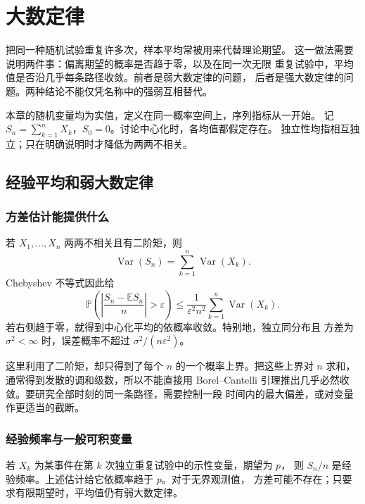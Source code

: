 \chapter{大数定律}
\label{chap:laws-of-large-numbers}

把同一种随机试验重复许多次，样本平均常被用来代替理论期望。
这一做法需要说明两件事：偏离期望的概率是否趋于零，以及在同一次无限
重复试验中，平均值是否沿几乎每条路径收敛。前者是弱大数定律的问题，
后者是强大数定律的问题。两种结论不能仅凭名称中的强弱互相替代。

本章的随机变量均为实值，定义在同一概率空间上，序列指标从一开始。
记 $S_n=\sum_{k=1}^nX_k$，$S_0=0$。讨论中心化时，各均值都假定存在。
独立性均指相互独立；只在明确说明时才降低为两两不相关。

\section{经验平均和弱大数定律}
\label{sec:weak-law-empirical-average}

\subsection{方差估计能提供什么}

若 $X_1,\ldots,X_n$ 两两不相关且有二阶矩，则
\[
 \operatorname{Var}(S_n)=\sum_{k=1}^n\operatorname{Var}(X_k).
\]
Chebyshev 不等式因此给
\begin{equation}
\label{eq:weak-law-variance-estimate}
 \mathbb P\left(\left|\frac{S_n-\mathbb ES_n}{n}\right|>\varepsilon\right)
 \le\frac1{\varepsilon^2n^2}\sum_{k=1}^n\operatorname{Var}(X_k).
\end{equation}
若右侧趋于零，就得到中心化平均的依概率收敛。特别地，独立同分布且
方差为 $\sigma^2<\infty$ 时，误差概率不超过 $\sigma^2/(n\varepsilon^2)$。

这里利用了二阶矩，却只得到了每个 $n$ 的一个概率上界。把这些上界对
$n$ 求和，通常得到发散的调和级数，所以不能直接用 Borel--Cantelli
引理推出几乎必然收敛。要研究全部时刻的同一条路径，需要控制一段
时间内的最大偏差，或对变量作更适当的截断。

\subsection{经验频率与一般可积变量}

若 $X_k$ 为某事件在第 $k$ 次独立重复试验中的示性变量，期望为 $p$，
则 $S_n/n$ 是经验频率。上述估计给它依概率趋于 $p$。对于无界观测值，
方差可能不存在；只要求有限期望时，平均值仍有弱大数定律。


